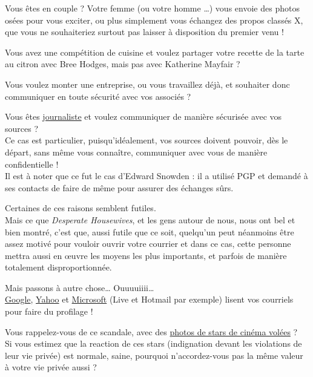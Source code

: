 Vous êtes en couple ? Votre femme (ou votre homme \ldots{}) vous envoie
des photos osées pour vous exciter, ou plus simplement vous échangez des
propos classés X, que vous ne souhaiteriez surtout pas laisser à
disposition du premier venu !

Vous avez une compétition de cuisine et voulez partager votre recette de la tarte au citron avec Bree Hodges, mais pas avec Katherine Mayfair ?

Vous voulez monter une entreprise, ou vous travaillez déjà, et souhaiter donc communiquer en toute sécurité avec vos associés ?

Vous êtes \href{\{filename\}../nouveau-journalisme.md}{journaliste} et
voulez communiquer de manière sécurisée avec vos sources ?\\Ce cas est
particulier, puisqu'idéalement, vos sources doivent pouvoir, dès le
départ, sans même vous connaître, communiquer avec vous de manière
confidentielle !\\Il est à noter que ce fut le cas d'Edward Snowden : il
a utilisé PGP et demandé à ses contacts de faire de même pour assurer
des échanges sûrs.

Certaines de ces raisons semblent futiles.\\Mais ce que \emph{Desperate
Housewives}, et les gens autour de nous, nous ont bel et bien montré,
c'est que, aussi futile que ce soit, quelqu'un peut néanmoins être assez
motivé pour vouloir ouvrir votre courrier et dans ce cas, cette personne
mettra aussi en œuvre les moyens les plus importants, et parfois de
manière totalement disproportionnée.

Mais passons à autre chose\ldots{}
Ouuuuiiii\ldots{}\\

\href{http://www.linformaticien.com/actualites/id/32860/google-lit-vos-mails-et-assume.aspx}{Google},
\href{http://www.zdnet.fr/actualites/yahoo-lit-les-emails-de-ses-utilisateurs-quoi-de-neuf-doc-39791003.htm}{Yahoo}
et \href{https://tosdr.org/\#microsoft}{Microsoft} (Live et Hotmail par exemple) lisent vos courriels pour faire du profilage !

Vous rappelez-vous de ce scandale, avec des
\href{http://www.huffingtonpost.fr/2014/09/02/jennifer-lawrence-nue-piratage-internet-kate-upton-photos-celebgate_n_5745970.html}{photos
de stars de cinéma volées} ?\\Si vous estimez que la reaction de ces
stars (indignation devant les violations de leur vie privée) est
normale, saine, pourquoi n'accordez-vous pas la même valeur à votre vie
privée aussi ?

